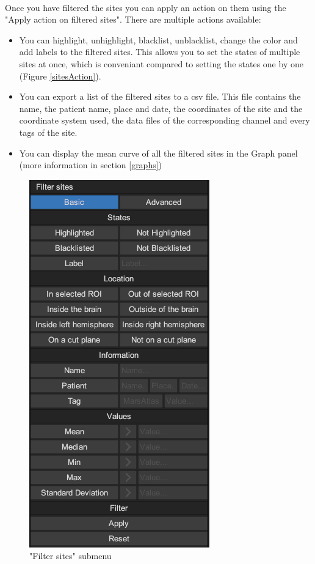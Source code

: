 \documentclass[a4paper]{article}
\begin{document}
\paragraph{} Once you have filtered the sites you can apply an action on them using the "Apply action on filtered sites". There are multiple actions available:
\begin{itemize}
\item You can highlight, unhighlight, blacklist, unblacklist, change the color and add labels to the filtered sites. This allows you to set the states of multiple sites at once, which is conveniant compared to setting the states one by one (Figure \ref{sitesAction}).
\item You can export a list of the filtered sites to a csv file. This file contains the name, the patient name, place and date, the coordinates of the site and the coordinate system used, the data files of the corresponding channel and every tags of the site.
\item You can display the mean curve of all the filtered sites in the Graph panel (more information in section \ref{graphs})
\end{itemize}
\begin{figure}[H]
\begin{center}
\includegraphics[scale=0.5]{BasicStates.png}
\end{center}
\caption{\label{basicStates}"Filter sites" submenu}
\end{figure}
\end{document}
